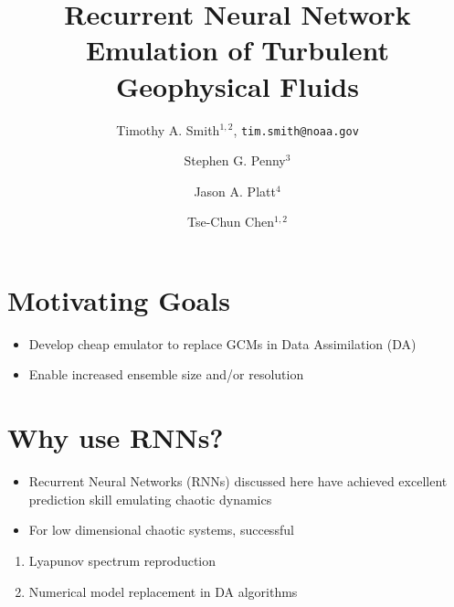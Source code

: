 \title{Recurrent Neural Network Emulation of Turbulent Geophysical Fluids}

\author{Timothy A. Smith$^{1,2}$, \texttt{tim.smith@noaa.gov}\vspace{-.25em}}

\begin{minipage}{.5\textwidth}
    \vspace{-1.25em}
    \author{Stephen G. Penny$^{3}$\vspace{.25em}}
    \author{Jason A. Platt$^{4}$\vspace{.25em}}
    \author{Tse-Chun Chen$^{1,2}$}
\end{minipage}
\begin{minipage}{.5\textwidth}
\end{minipage}

\section{Motivating Goals}
\begin{itemize}
    \item Develop cheap emulator to replace GCMs in Data Assimilation (DA)
    \item Enable increased ensemble size and/or resolution
\end{itemize}

\section{Why use RNNs?}
\begin{itemize}
    \item Recurrent Neural Networks (RNNs) discussed here have achieved excellent
        prediction skill emulating chaotic dynamics \cite{platt_systematic_2022}
    \item For low dimensional chaotic systems, successful
\end{itemize}

\hfill\begin{minipage}{.95\textwidth}
    \begin{enumerate}
        \item Lyapunov spectrum reproduction\cite{pathak_using_2017}
        \item Numerical model replacement in DA algorithms
            \cite{penny_integrating_2022}
    \end{enumerate}
\end{minipage}


